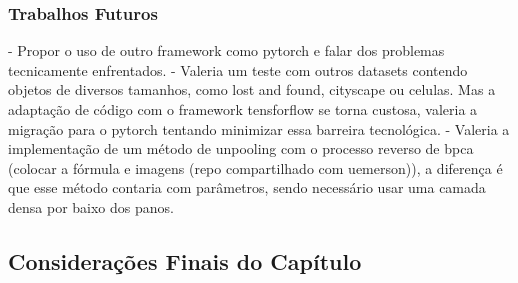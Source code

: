 \subsubsection{Trabalhos Futuros}
\label{results:semantic:future}
- Propor o uso de outro framework como pytorch e falar dos problemas tecnicamente enfrentados.
- Valeria um teste com outros datasets contendo objetos de diversos tamanhos, como lost and found, cityscape ou celulas. Mas a adaptação de código com o framework tensforflow se torna custosa, valeria a migração para o pytorch tentando minimizar essa barreira tecnológica.
- Valeria a implementação de um método de unpooling com o processo reverso de bpca (colocar a fórmula e imagens (repo compartilhado com uemerson)), a diferença é que esse método contaria com parâmetros, sendo necessário usar uma camada densa por baixo dos panos.


\subsection{Considerações Finais do Capítulo}
\label{result:final}
